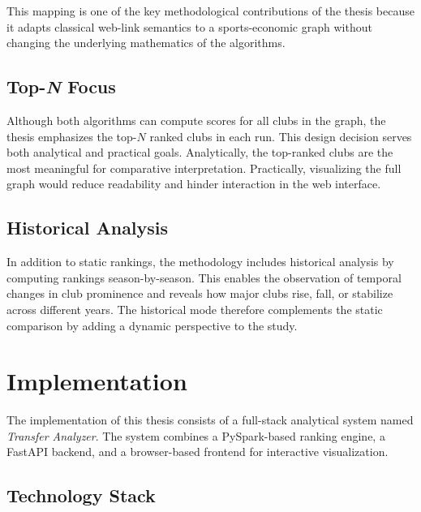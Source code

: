 This mapping is one of the key methodological contributions of the thesis because it adapts classical web-link semantics to a sports-economic graph without changing the underlying mathematics of the algorithms.

\subsection{Top-\emph{N} Focus}
\label{subsec:topn_focus}

Although both algorithms can compute scores for all clubs in the graph, the thesis emphasizes the top-$N$ ranked clubs in each run. This design decision serves both analytical and practical goals. Analytically, the top-ranked clubs are the most meaningful for comparative interpretation. Practically, visualizing the full graph would reduce readability and hinder interaction in the web interface.

\subsection{Historical Analysis}
\label{subsec:historical_analysis}

In addition to static rankings, the methodology includes historical analysis by computing rankings season-by-season. This enables the observation of temporal changes in club prominence and reveals how major clubs rise, fall, or stabilize across different years. The historical mode therefore complements the static comparison by adding a dynamic perspective to the study.


\section{Implementation}
\label{sec:implementation}

The implementation of this thesis consists of a full-stack analytical system named \textit{Transfer Analyzer}. The system combines a PySpark-based ranking engine, a FastAPI backend, and a browser-based frontend for interactive visualization.

\subsection{Technology Stack}
\label{subsec:technology_stack}


